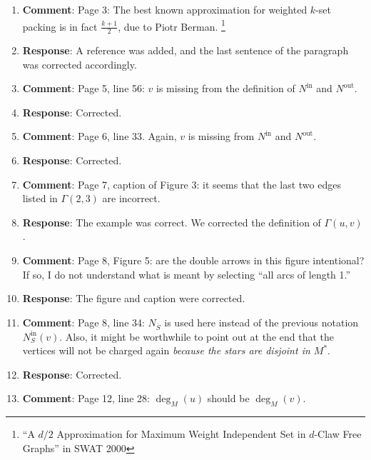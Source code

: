 \documentclass[11pt]{article}
\begin{document}
\begin{enumerate}

\item \textbf{Comment}: Page 3: The best known approximation for
  weighted $k$-set packing is in fact $\frac{k+1}{2}$, due to Piotr Berman.%
%
\footnote{``A $d/2$ Approximation for Maximum Weight Independent Set
  in $d$-Claw Free Graphs'' in SWAT 2000}

\item[] \textbf{Response}: A reference was added, and the last
  sentence of the paragraph was corrected accordingly.

\item \textbf{Comment}: Page 5, line 56: $v$ is missing from the
  definition of $N^{\text{in}}$ and $N^{\text{out}}$.

\item[] \textbf{Response}: Corrected.
  
\item \textbf{Comment}: Page 6, line 33. Again, $v$ is missing from
  $N^{\text{in}}$ and $N^{\text{out}}$.

\item[] \textbf{Response}: Corrected.
  
\item \textbf{Comment}: Page 7, caption of Figure 3: it seems that the
  last two edges listed in $\Gamma(2,3)$ are incorrect.

\item[] \textbf{Response}: The example was correct.  We corrected the
  definition of $\Gamma(u,v)$.

\item \textbf{Comment}: Page 8, Figure 5: are the double arrows in
  this figure intentional? If so, I do not understand what is meant by
  selecting ``all arcs of length 1.''

\item[] \textbf{Response}: The figure and caption were corrected.
  
\item \textbf{Comment}: Page 8, line 34: $N_{\overline{S}}$ is used
  here instead of the previous notation $N^{\text{in}}_S(v)$.  Also,
  it might be worthwhile to point out at the end that the vertices
  will not be charged again \emph{because the stars are disjoint in
    $M^*$}.

\item[] \textbf{Response}: Corrected.

\item \textbf{Comment}: Page 12, line 28: $\deg_M(u)$ should be
  $\deg_M(v)$.
  

\end{enumerate}
\end{document}
